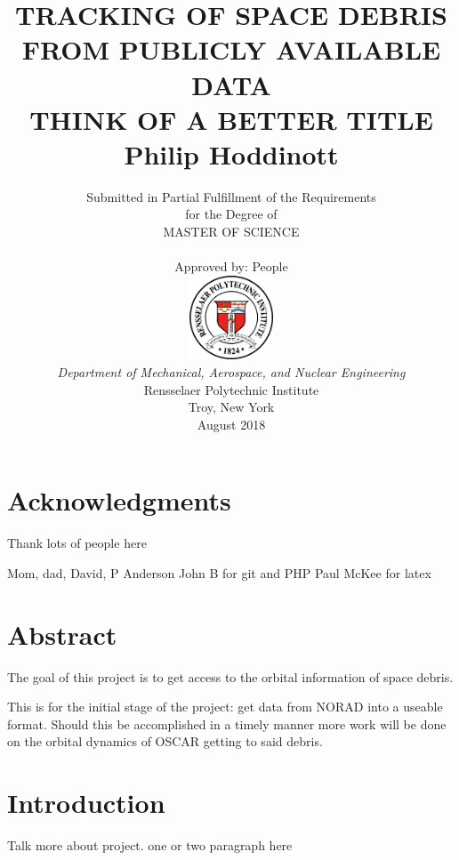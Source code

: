 \documentclass[12pt]{report}
\title{ 
		\LARGE \textbf{\uppercase{Tracking of space debris from publicly available data\\ Think of a better title}} \\
		\vspace{0.25cm}
		\LARGE \textbf{Philip Hoddinott}
	}
\author{\small{Submitted in Partial Fulfillment of the Requirements} \\ \small{for the Degree of} \\
		\uppercase{Master of Science} \\ \\
		Approved by: People\\
		\includegraphics[width=2.5cm]{rensselaer_seal.png} \\
		\small{\textit{Department of Mechanical, Aerospace, and Nuclear Engineering}} \\
		\small{Rensselaer Polytechnic Institute} \\ 
		\small{Troy, New York} \\
		\small{August 2018}
	}
\begin{document}
	\maketitle
	
	\setcounter{page}{2}
	\tableofcontents
	\listoftables
	\listoffigures
	
	\newpage
	\section{Acknowledgments}
	
	
	Thank lots of people here\par 
	
	Mom, dad, David,
	P Anderson
	John B for git and PHP
	Paul McKee for latex 
	
	
	

	
	
	\newpage
	\section{Abstract}

The goal of this project is to get access to the orbital information of space debris.\par 
This is for the initial stage of the project: get data from NORAD into a useable format. Should this be accomplished in a timely manner more work will be done on the orbital dynamics of OSCAR getting to said debris.
	\newpage
	\section{Introduction}
	
	Talk more about project. one or two paragraph here 
\end{document}
